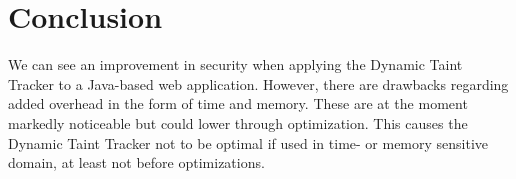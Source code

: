 \chapter{Conclusion}
We can see an improvement in security when applying the Dynamic Taint Tracker to a Java-based web application. However, there are drawbacks regarding added overhead in the form of time and memory. These are at the moment markedly noticeable but could lower through optimization. This causes the Dynamic Taint Tracker not to be optimal if used in time- or memory sensitive domain, at least not before optimizations.